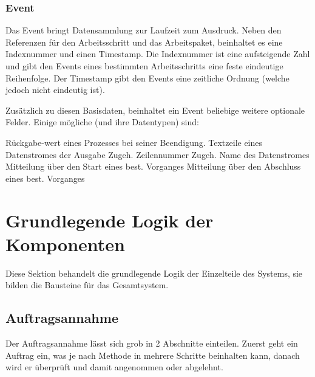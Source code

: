 

\subsubsection{Event}

Das Event bringt Datensammlung zur Laufzeit zum Ausdruck.
Neben den Referenzen für den Arbeitsschritt und das Arbeitspaket,
beinhaltet es eine Indexnummer und einen Timestamp.
Die Indexnummer ist eine aufsteigende Zahl
und gibt den Events eines bestimmten Arbeitsschritts eine feste eindeutige Reihenfolge.
Der Timestamp gibt den Events eine zeitliche Ordnung (welche jedoch nicht eindeutig ist).


Zusätzlich zu diesen Basisdaten, beinhaltet ein Event beliebige weitere optionale Felder.
Einige mögliche (und ihre Datentypen) sind:

\begin{description}
     Rückgabe-wert eines Prozesses bei seiner Beendigung.
     Textzeile eines Datenstromes der Ausgabe
     Zugeh. Zeilennummer
     Zugeh. Name des Datenstromes
     Mitteilung über den Start eines best. Vorganges
     Mitteilung über den Abschluss eines best. Vorganges
\end{description}




\section{Grundlegende Logik der Komponenten}

Diese Sektion behandelt die grundlegende Logik  der Einzelteile des Systems,
sie bilden die Bausteine für das Gesamtsystem.


\subsection{Auftragsannahme}

Der Auftragsannahme lässt sich grob in 2 Abschnitte einteilen.
Zuerst geht ein Auftrag ein, was je nach Methode in mehrere Schritte beinhalten kann,
danach wird er überprüft und damit angenommen oder abgelehnt.



